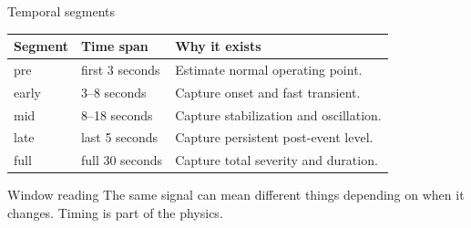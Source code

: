 \documentclass[10pt,aspectratio=169]{beamer}
\begin{document}
\begin{frame}{Temporal segments}
\small
\centering
\begin{tabular}{lp{}p{}}
\toprule
\textbf{Segment} & \textbf{Time span} & \textbf{Why it exists}\\
\midrule
pre & first 3 seconds & Estimate normal operating point.\\
early & 3--8 seconds & Capture onset and fast transient.\\
mid & 8--18 seconds & Capture stabilization and oscillation.\\
late & last 5 seconds & Capture persistent post-event level.\\
full & full 30 seconds & Capture total severity and duration.\\
\bottomrule
\end{tabular}
\vspace{3mm}
\begin{alertblock}{Window reading}
The same signal can mean different things depending on when it changes. Timing is part of the physics.
\end{alertblock}
\end{frame}
\end{document}
